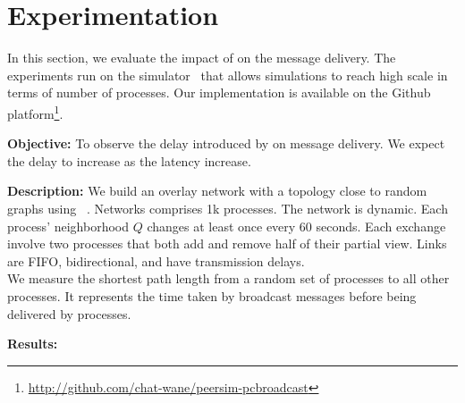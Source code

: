 
\section{Experimentation}
\label{sec:experimentation}


In this section, we evaluate the impact of \CBROADCAST on the message
delivery. The experiments run on the \PEERSIM
simulator~\cite{montresor2009peersim} that allows simulations to reach high
scale in terms of number of processes. Our implementation is available on the
Github platform\footnote{\url{http://github.com/chat-wane/peersim-pcbroadcast}}.


\noindent \textbf{Objective:} To observe the delay introduced by \CBROADCAST on
message delivery. We expect the delay to increase as the latency increase.

\noindent \textbf{Description:} We build an overlay network with a topology
close to random graphs using \SPRAY~\cite{nedelec2017adaptive}. Networks
comprises 1k processes. The network is dynamic. Each process' neighborhood $Q$
changes at least once every 60 seconds. Each exchange involve two processes that
both add and remove half of their partial view.  Links are FIFO, bidirectional,
and have transmission delays.\\
We measure the shortest path length from a random set of processes to all other
processes. It represents the time taken by broadcast messages before being
delivered by processes. 

\noindent \textbf{Results:} 


